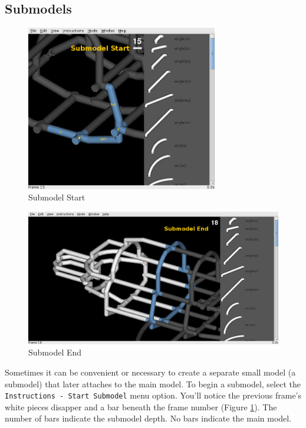 \documentclass[12pt]{report}
\begin{document}
\subsection{Submodels}

\begin{figure}[H]
\begin{center}
\includegraphics[width=3.29in]{doc_images/manual_instructions_submodel_start.png}
\caption{Submodel Start}
\label{InstructionsSubmodelStart}
\end{center}
\end{figure}

\begin{figure}[h]
\begin{center}
\includegraphics[width=5.38in]{doc_images/manual_instructions_submodel_end.png}
\caption{Submodel End}
\label{InstructionsSubmodelEnd}
\end{center}
\end{figure}

Sometimes it can be convenient or necessary to create a separate small
model (a submodel) that later attaches to the main model.  To begin a
submodel, select the {\tt Instructions - Start Submodel} menu option.
You'll notice the previous frame's white pieces disapper and a bar
beneath the frame number (Figure \ref{InstructionsSubmodelStart}).
The number of bars indicate the submodel depth.  No bars indicate the
main model.
\end{document}
